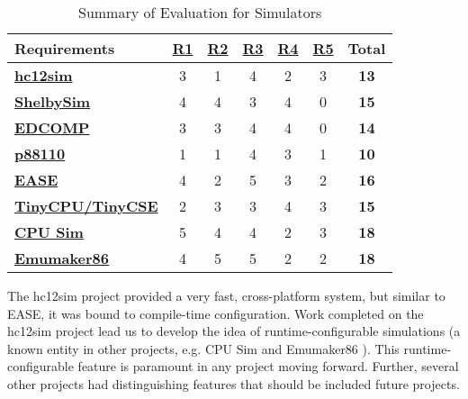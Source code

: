 \begin{table}[h!]
    \centering
    \begin{tabular}{lcccccc}
        \textbf{Requirements} & \textbf{\hyperref[req:personal]{R1}} & \textbf{\hyperref[req:configuration]{R2}} & \textbf{\hyperref[req:pedagogical]{R3}} & \textbf{\hyperref[req:simulations]{R4}} & \textbf{\hyperref[req:modern]{R5}} & \textbf{Total} \\ \hline
        
        \textbf{\hyperref[sec:review-prev-hc12sim]{hc12sim} \cite{Brightwell2013}} 
        & 3 & 1 & 4 & 2 & 3 & \textbf{13} \\
        \textbf{\hyperref[sec:review-shelbysim]{ShelbySim} \cite{Tappan2009, Tappan2009-2}} 
        & 4 & 4 & 3 & 4 & 0 & \textbf{15} \\
        \textbf{\hyperref[sec:review-edcomp]{EDCOMP} \cite{Djordjevic2005}}
        & 3 & 3 & 4 & 4 & 0 & \textbf{14} \\
        \textbf{\hyperref[sec:review-p88110]{p88110} \cite{Garcia2009}}
        & 1 & 1 & 4 & 3 & 1 & \textbf{10}  \\
        \textbf{\hyperref[sec:review-ease]{EASE} \cite{Skillen2011}}
        & 4 & 2 & 5 & 3 & 2 & \textbf{16} \\
        \textbf{\hyperref[sec:review-tiny-cse]{TinyCPU/TinyCSE} \cite{Nakamura2013,McLoughlin2010}} 
        & 2 & 3 & 3 & 4 & 3 & \textbf{15} \\
        \textbf{\hyperref[sec:review-cpu-sim]{CPU Sim} \cite{Skrien2001, Skrien2017}}
        & 5 & 4 & 4 & 2 & 3 & \textbf{18} \\
        \textbf{\hyperref[sec:review-emumaker86]{Emumaker86} \cite{Black2013}} 
        & 4 & 5 & 5 & 2 & 2 & \textbf{18} \\ 
    \end{tabular}
    \caption{Summary of Evaluation for Simulators}
    \label{table:simulator-evaluation-summary}
\end{table}

The hc12sim project provided a very fast, cross-platform system, but similar to EASE, it was bound to compile-time configuration. Work completed on the hc12sim project lead us to develop the idea of runtime-configurable simulations (a known entity in other projects, e.g. CPU Sim \cite{Skrien2001} and Emumaker86 \cite{Black2013}). This runtime-configurable feature is paramount in any project moving forward. Further, several other projects had distinguishing features that should be included future projects. 

